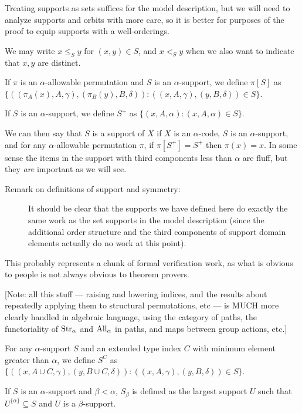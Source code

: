 Treating supports as sets suffices for the model description, but we will need to analyze supports and orbits with more care, so it is better for purposes
of the proof to equip supports with a well-orderings.

We may write $x \leq_S y$ for $(x,y) \in S$, and $x <_S y$ when we also want to indicate that $x,y$ are distinct.

If $\pi$ is an $\alpha$-allowable permutation and $S$ is an $\alpha$-support, we define $\pi[S]$ as $\{((\pi_A(x),A,\gamma),(\pi_B(y),B,\delta)):((x,A,\gamma),(y,B,\delta))\in S\}$.

If $S$ is an $\alpha$-support, we define $S^+$ as $\{(x,A,\alpha):(x,A,\alpha) \in S\}$.

We can then say that $S$ is a support of $X$ if $X$ is an $\alpha$-code, $S$ is an $\alpha$-support, and for any $\alpha$-allowable permutation $\pi$, if $\pi[S^+]=S^+$ then $\pi(x)=x$.  In some sense the items in the support with third components less than $\alpha$ are fluff, but they {\em are\/} important as we will see.

\begin{description}
\item[Remark on definitions of support and symmetry:]  It should be clear that the supports we have defined here do exactly the same work as the set supports in the model description (since the additional order structure and the third components of support domain elements actually do no work at this point).
\end{description}

This probably represents a chunk of formal verification work, as what is obvious to people is not always obvious to theorem provers.

\begin{definition}
\label {def:raise-lower-index}
[Note: all this stuff — raising and lowering indices, and the results about repeatedly applying them to structural permutations, etc — is MUCH more clearly handled in algebraic language, using the category of paths, the functoriality of $\mathrm{Str}_\alpha$ and $\mathrm{All}_\alpha$ in paths, and maps between group actions, etc.]

For any $\alpha$-support $S$ and an extended type index $C$ with minimum element greater than $\alpha$, we define $S^C$ as
$\{((x,A\cup C,\gamma),(y,B\cup C,\delta)):((x,A,\gamma),(y,B,\delta)) \in S\}$.

If $S$ is an $\alpha$-support and $\beta<\alpha$, $S_\beta$ is defined as the largest support $U$ such that $U^{\{\alpha\}} \subseteq S$ and $U$ is a $\beta$-support.
\end{definition}

